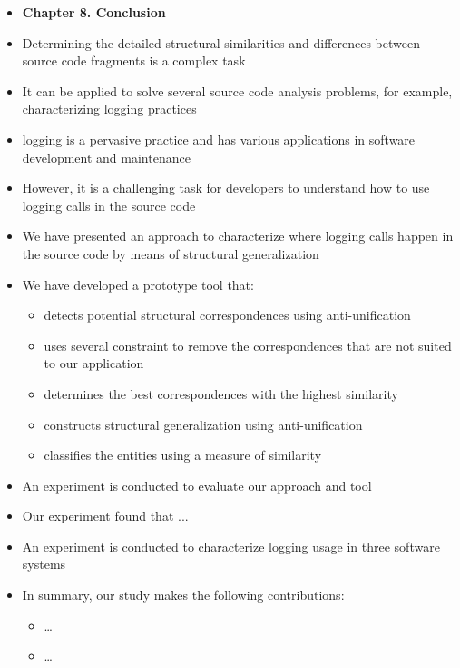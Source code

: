 \documentclass{article}
\newcommand{\bold}{\textbf}
\begin{document}
\begin{itemize} [leftmargin=.1in]
\item \bold{Chapter 8. Conclusion}
\item Determining the detailed structural similarities and differences between source code fragments is a complex task
\item It can be applied to solve several source code analysis problems, for example, characterizing logging practices
\item logging is a pervasive practice and has various applications in software development and maintenance
\item However, it is a challenging task for developers to understand how to use logging calls in the source code
\item We have presented an approach to characterize where logging calls happen in the source code by means of structural generalization
\item We have developed a prototype tool that:
\begin{itemize}
\item detects potential structural correspondences using anti-unification
\item uses several constraint to remove the correspondences that are not suited to our application
\item determines the best correspondences with the highest similarity
\item constructs structural generalization using anti-unification
\item classifies the entities using a measure of similarity
\end{itemize}
\item An experiment is conducted to evaluate our approach and tool
\item Our experiment found that ...
\item An experiment is conducted to characterize logging usage in three software systems
\item In summary, our study makes the following contributions:
\begin{itemize}
\item …
\item …
\end{itemize}


\end{itemize}
\end{document}
